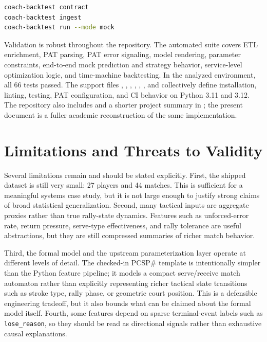 \documentclass{article}
\begin{document}
\begin{lstlisting}[style=code,language=bash,caption={Backtesting CLI surface exposed in \texttt{coach/backtest/cli.py}.}]
coach-backtest contract
coach-backtest ingest
coach-backtest run --mode mock
\end{lstlisting}

Validation is robust throughout the repository. The automated suite covers ETL enrichment, PAT parsing, PAT error signaling, model rendering, parameter constraints, end-to-end mock prediction and strategy behavior, service-level optimization logic, and time-machine backtesting. In the analyzed environment, all 66 tests passed. The support files , , , , , , and  collectively define installation, linting, testing, PAT configuration, and CI behavior on Python 3.11 and 3.12. The repository also includes  and a shorter project summary in ; the present document is a fuller academic reconstruction of the same implementation.

\section{Limitations and Threats to Validity}
Several limitations remain and should be stated explicitly. First, the shipped dataset is still very small: 27 players and 44 matches. This is sufficient for a meaningful systems case study, but it is not large enough to justify strong claims of broad statistical generalization. Second, many tactical inputs are aggregate proxies rather than true rally-state dynamics. Features such as unforced-error rate, return pressure, serve-type effectiveness, and rally tolerance are useful abstractions, but they are still compressed summaries of richer match behavior.

Third, the formal model and the upstream parameterization layer operate at different levels of detail. The checked-in PCSP\# template is intentionally simpler than the Python feature pipeline; it models a compact serve/receive match automaton rather than explicitly representing richer tactical state transitions such as stroke type, rally phase, or geometric court position. This is a defensible engineering tradeoff, but it also bounds what can be claimed about the formal model itself. Fourth, some features depend on sparse terminal-event labels such as \texttt{lose\_reason}, so they should be read as directional signals rather than exhaustive causal explanations.
\end{document}
